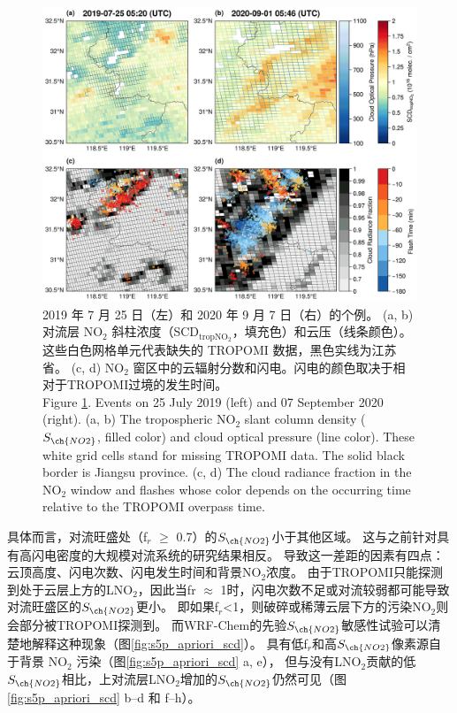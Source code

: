\begin{figure}[!htbp]
    \centering
    \includegraphics[width=12cm]{./figures/china_flash_scd.png}
    \caption{
    2019 年 7 月 25 日（左）和 2020 年 9 月 7 日（右）的个例。
    (a, b) 对流层 NO$_2$ 斜柱浓度（SCD$_\textrm{tropNO$_2$}$，填充色）和云压（线条颜色）。
    这些白色网格单元代表缺失的 TROPOMI 数据，黑色实线为江苏省。
     (c, d) NO$_2$ 窗区中的云辐射分数和闪电。闪电的颜色取决于相对于TROPOMI过境的发生时间。\\
    Figure \ref{fig:china_flash_scd}. Events on 25 July 2019 (left) and 07 September 2020 (right).
    (a, b) The tropospheric NO$_2$ slant column density ($S_{\ch{NO2}}$, filled color) and cloud optical pressure (line color).
    These white grid cells stand for missing TROPOMI data.
    The solid black border is Jiangsu province.
    (c, d) The cloud radiance fraction in the NO$_2$ window and flashes whose color depends on the occurring time relative to the TROPOMI overpass time.
    }
    \label{fig:china_flash_scd}
\end{figure}

具体而言，对流旺盛处（f$_r$ $\geq$ 0.7）的$S_{\ch{NO2}}$小于其他区域。
这与之前针对具有高闪电密度的大规模对流系统的研究结果相反\citep{Beirle.2009}。
导致这一差距的因素有四点：云顶高度、闪电次数、闪电发生时间和背景NO$_2$浓度。
由于TROPOMI只能探测到处于云层上方的LNO$_2$，因此当fr $\approx$ 1时，闪电次数不足或对流较弱都可能导致对流旺盛区的$S_{\ch{NO2}}$更小。
即如果f$_r$<1，则破碎或稀薄云层下方的污染NO$_2$则会部分被TROPOMI探测到。
而WRF-Chem的先验$S_{\ch{NO2}}$敏感性试验可以清楚地解释这种现象（图\ref{fig:s5p_apriori_scd}）。
具有低f$_r$和高$S_{\ch{NO2}}$像素源自于背景 NO$_2$ 污染（图\ref{fig:s5p_apriori_scd} a, e），
但与没有LNO$_2$贡献的低$S_{\ch{NO2}}$相比，上对流层LNO$_2$增加的$S_{\ch{NO2}}$仍然可见（图\ref{fig:s5p_apriori_scd} b--d 和 f--h）。

